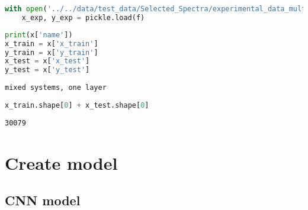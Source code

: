 \begin{lstlisting}[language=Python]
with open('../../data/test_data/Selected_Spectra/experimental_data_multi.pkl', 'rb') as f:
    x_exp, y_exp = pickle.load(f)
\end{lstlisting}

\begin{lstlisting}[language=Python]
print(x['name'])
x_train = x['x_train']
y_train = x['y_train']
x_test = x['x_test']
y_test = x['y_test']
\end{lstlisting}

\begin{lstlisting}
mixed systems, one layer
\end{lstlisting}

\begin{lstlisting}[language=Python]
x_train.shape[0] + x_test.shape[0]
\end{lstlisting}

\begin{lstlisting}
30079
\end{lstlisting}

\hypertarget{create-model}{%
\section{Create model}\label{create-model}}

\hypertarget{cnn-model}{%
\subsection{CNN model}\label{cnn-model}}

